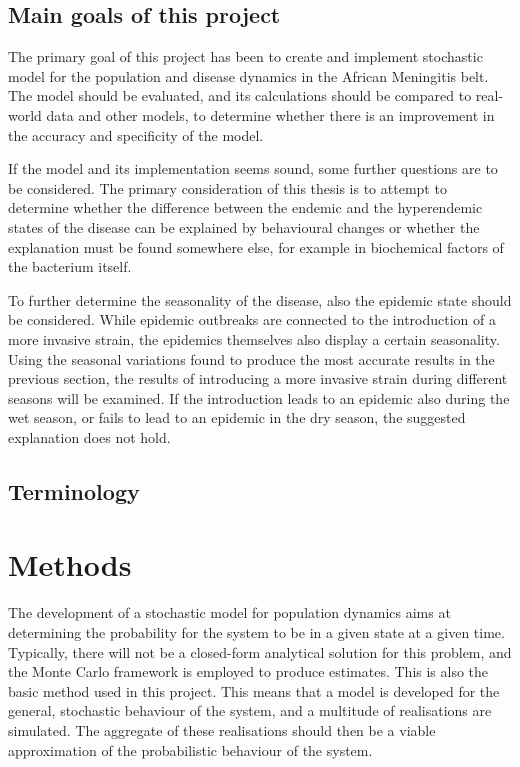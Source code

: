 \documentclass[10pt,a4paper]{article}
\begin{document}
\subsection{Main goals of this project}

The primary goal of this project has been to create and implement stochastic model for the population and disease dynamics in the African Meningitis belt. The model should be evaluated, and its calculations should be compared to real-world data and other models, to determine whether there is an improvement in the accuracy and specificity of the model.

If the model and its implementation seems sound, some further questions are to be considered. The primary consideration of this thesis is to attempt to determine whether the difference between the endemic and the hyperendemic states of the disease can be explained by behavioural changes or whether the explanation must be found somewhere else, for example in biochemical factors of the bacterium itself.

To further determine the seasonality of the disease, also the epidemic state should be considered. While epidemic outbreaks are connected to the introduction of a more invasive strain, the epidemics themselves also display a certain seasonality. Using the seasonal variations found to produce the most accurate results in the previous section, the results of introducing a more invasive strain during different seasons will be examined. If the introduction leads to an epidemic also during the wet season, or fails to lead to an epidemic in the dry season, the suggested explanation does not hold.


\subsection{Terminology}

\section{Methods}

The development of a stochastic model for population dynamics aims at determining the probability for the system to be in a given state at a given time. Typically, there will not be a closed-form analytical solution for this problem, and the Monte Carlo framework is employed to produce estimates. This is also the basic method used in this project. This means that a model is developed for the general, stochastic behaviour of the system, and a multitude of realisations are simulated. The aggregate of these realisations should then be a viable approximation of the probabilistic behaviour of the system.
\end{document}
